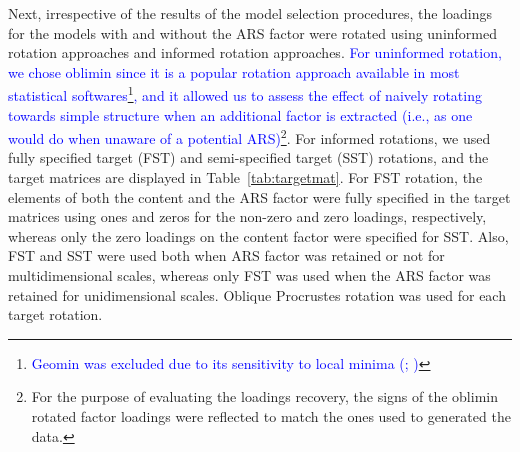 \documentclass[a4paper,man,natbib]{apa6}
\begin{document}
\begin{linenumbers}
\begin{table}[]
\end{table}

Next, irrespective of the results of the model selection procedures, the loadings for the models with and without the ARS factor were rotated using uninformed rotation approaches and informed rotation approaches.\label{refpage:R1Mj2a} \textcolor{blue}{For uninformed rotation, we chose oblimin since it is a popular rotation approach available in most statistical softwares\footnote{\textcolor{blue}{Geomin \citep{yates1988multivariate} was excluded due to its sensitivity to local minima (\citealp{browne2001overview}; \citealp{asparouhov2009exploratory})}}, and it allowed us to assess the effect of naively rotating towards simple structure when an additional factor is extracted (i.e., as one would do when unaware of a potential ARS)}\footnote{For the purpose of evaluating the loadings recovery, the signs of the oblimin rotated factor loadings were reflected to match the ones used to generated the data.}. For informed rotations, we used fully specified target (FST) and semi-specified target (SST) rotations, and the target matrices are displayed in Table~\ref{tab:targetmat}. For FST rotation, the elements of both the content and the ARS factor were fully specified in the target matrices using ones and zeros for the non-zero and zero loadings, respectively, whereas only the zero loadings on the content factor were specified for SST. Also, FST and SST were used both when ARS factor was retained or not for multidimensional scales, whereas only FST was used when the ARS factor was retained for unidimensional scales.
Oblique Procrustes rotation was used for each target rotation. 



\end{linenumbers}
\end{document}
